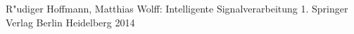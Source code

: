 \begin{thebibliography}{}
 R"udiger Hoffmann, Matthias Wolff: Intelligente Signalverarbeitung 1. Springer Verlag Berlin Heidelberg 2014
\end{thebibliography}
